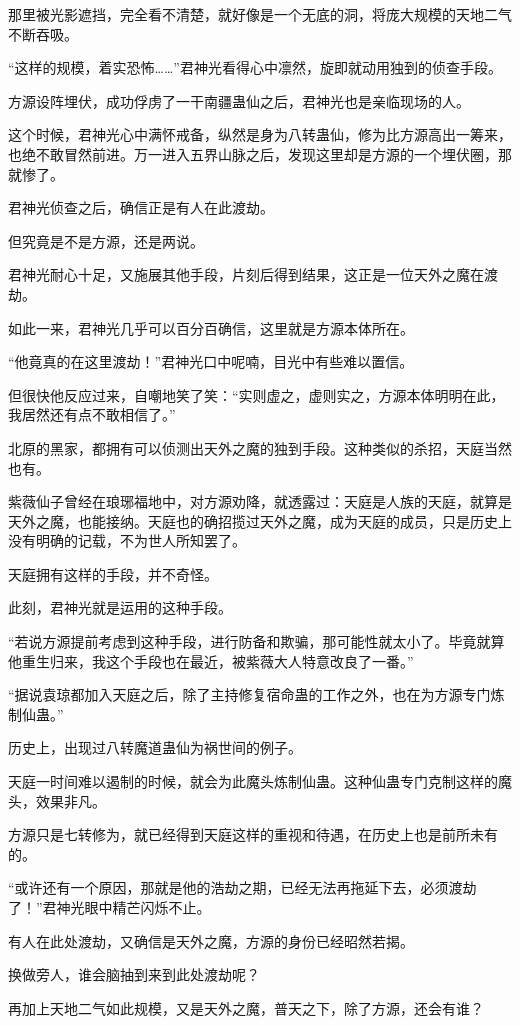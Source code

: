 \begin{this_body}
那里被光影遮挡，完全看不清楚，就好像是一个无底的洞，将庞大规模的天地二气不断吞吸。

“这样的规模，着实恐怖……”君神光看得心中凛然，旋即就动用独到的侦查手段。

方源设阵埋伏，成功俘虏了一干南疆蛊仙之后，君神光也是亲临现场的人。

这个时候，君神光心中满怀戒备，纵然是身为八转蛊仙，修为比方源高出一筹来，也绝不敢冒然前进。万一进入五界山脉之后，发现这里却是方源的一个埋伏圈，那就惨了。

君神光侦查之后，确信正是有人在此渡劫。

但究竟是不是方源，还是两说。

君神光耐心十足，又施展其他手段，片刻后得到结果，这正是一位天外之魔在渡劫。

如此一来，君神光几乎可以百分百确信，这里就是方源本体所在。

“他竟真的在这里渡劫！”君神光口中呢喃，目光中有些难以置信。

但很快他反应过来，自嘲地笑了笑：“实则虚之，虚则实之，方源本体明明在此，我居然还有点不敢相信了。”

北原的黑家，都拥有可以侦测出天外之魔的独到手段。这种类似的杀招，天庭当然也有。

紫薇仙子曾经在琅琊福地中，对方源劝降，就透露过：天庭是人族的天庭，就算是天外之魔，也能接纳。天庭也的确招揽过天外之魔，成为天庭的成员，只是历史上没有明确的记载，不为世人所知罢了。

天庭拥有这样的手段，并不奇怪。

此刻，君神光就是运用的这种手段。

“若说方源提前考虑到这种手段，进行防备和欺骗，那可能性就太小了。毕竟就算他重生归来，我这个手段也在最近，被紫薇大人特意改良了一番。”

“据说袁琼都加入天庭之后，除了主持修复宿命蛊的工作之外，也在为方源专门炼制仙蛊。”

历史上，出现过八转魔道蛊仙为祸世间的例子。

天庭一时间难以遏制的时候，就会为此魔头炼制仙蛊。这种仙蛊专门克制这样的魔头，效果非凡。

方源只是七转修为，就已经得到天庭这样的重视和待遇，在历史上也是前所未有的。

“或许还有一个原因，那就是他的浩劫之期，已经无法再拖延下去，必须渡劫了！”君神光眼中精芒闪烁不止。

有人在此处渡劫，又确信是天外之魔，方源的身份已经昭然若揭。

换做旁人，谁会脑抽到来到此处渡劫呢？

再加上天地二气如此规模，又是天外之魔，普天之下，除了方源，还会有谁？


\end{this_body}
